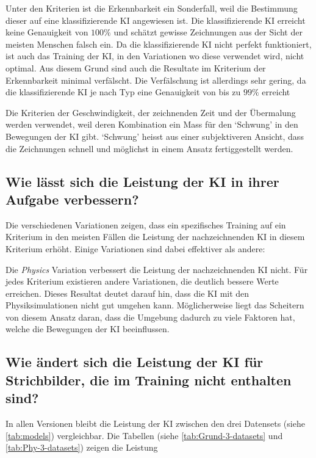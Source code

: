 Unter den Kriterien ist die Erkennbarkeit ein Sonderfall, weil die Bestimmung
dieser auf eine klassifizierende KI angewiesen ist. Die klassifizierende KI
erreicht keine Genauigkeit von $100\%$ und schätzt gewisse Zeichnungen aus der
Sicht der meisten Menschen falsch ein. Da die klassifizierende KI nicht perfekt
funktioniert, ist auch das Training der KI, in den Variationen wo diese
verwendet wird, nicht optimal. Aus diesem Grund sind auch die Resultate im
Kriterium der Erkennbarkeit minimal verfälscht. Die Verfälschung ist allerdings
sehr gering, da die klassifizierende KI je nach Typ eine Genauigkeit von bis zu
$99\%$ erreicht 

Die Kriterien der Geschwindigkeit, der zeichnenden Zeit und der Übermalung
werden verwendet, weil deren Kombination ein Mass für den `Schwung' in den
Bewegungen der KI gibt. `Schwung' heisst aus einer subjektiveren Ansicht, dass
die Zeichnungen schnell und möglichst in einem Ansatz fertiggestellt werden.


\subsection{Wie lässt sich die Leistung der KI in ihrer Aufgabe verbessern?}\label{subsub:d_frage_unter_3}

Die verschiedenen Variationen zeigen, dass ein spezifisches Training auf ein
Kriterium in den meisten Fällen die Leistung der nachzeichnenden KI in diesem
Kriterium erhöht. Einige Variationen sind dabei effektiver als andere:



Die \emph{Physics} Variation verbessert die Leistung der nachzeichnenden KI
nicht. Für jedes Kriterium existieren andere Variationen, die deutlich bessere
Werte erreichen. Dieses Resultat deutet darauf hin, dass die KI mit den
Physiksimulationen nicht gut umgehen kann. Möglicherweise liegt das Scheitern
von diesem Ansatz daran, dass die Umgebung dadurch zu viele Faktoren hat, welche die
Bewegungen der KI beeinflussen.


\subsection{Wie ändert sich die Leistung der KI für Strichbilder, die im Training nicht enthalten sind?}\label{subsub:d_frage_unter_4}

In allen Versionen bleibt die Leistung der KI zwischen den drei Datensets
(siehe \autoref{tab:models}) vergleichbar. Die Tabellen (siehe \autoref{tab:Grund-3-datasets} und \autoref{tab:Phy-3-datasets})
zeigen die Leistung

